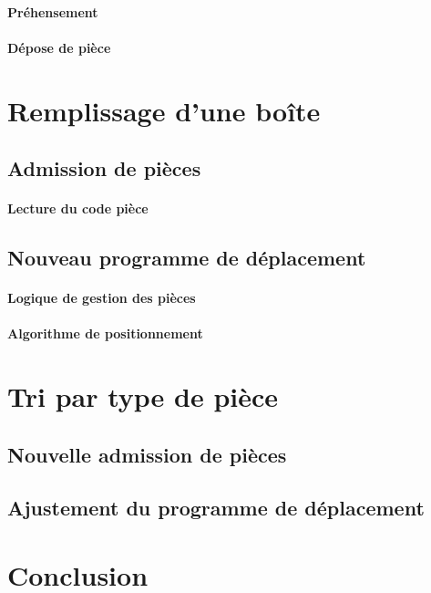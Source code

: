 \documentclass[oneside,a4paper,12pt]{article}
\begin{document}
		\paragraph{Préhensement}
	
		\paragraph{Dépose de pièce}
	
	\section{Remplissage d'une boîte}
				
		\subsection{Admission de pièces}
			\paragraph{Lecture du code pièce}
		
		\subsection{Nouveau programme de déplacement}
			\paragraph{Logique de gestion des pièces}
			
			\paragraph{Algorithme de positionnement}

	\section{Tri par type de pièce}
		\subsection{Nouvelle admission de pièces}
		
		\subsection{Ajustement du programme de déplacement}
	
	\section{Conclusion}
	
\end{document}
